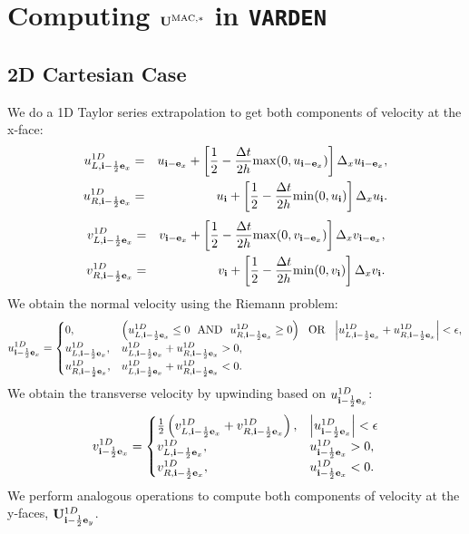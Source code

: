 \newpage

\section{Computing ${\bf U}^{\rm MAC,*}$ in {\tt VARDEN}}

\subsection{2D Cartesian Case}
We do a 1D Taylor series extrapolation to get both components of velocity at the x-face:
\begin{eqnarray}
u_{L,{\bf i}-\frac{1}{2}{\bf e}_x}^{1D} &=& u_{{\bf i}-{\bf e}_x} + \left[\frac{1}{2} - \frac{\Delta t}{2h}{\rm max}(0,u_{{\bf i}-{\bf e}_x})\right]\Delta_xu_{{\bf i}-{\bf e}_x}, \label{varden U_L^1D} \\
u_{R,{\bf i}-\frac{1}{2}{\bf e}_x}^{1D} &=& u_{{\bf i}} + \left[\frac{1}{2} - \frac{\Delta t}{2h}{\rm min}(0,u_{{\bf i}})\right]\Delta_xu_{{\bf i}}.
\end{eqnarray}
\begin{eqnarray}
v_{L,{\bf i}-\frac{1}{2}{\bf e}_x}^{1D} &=& v_{{\bf i}-{\bf e}_x} + \left[\frac{1}{2} - \frac{\Delta t}{2h}{\rm max}(0,v_{{\bf i}-{\bf e}_x})\right]\Delta_xv_{{\bf i}-{\bf e}_x}, \label{varden U_L^1D} \\
v_{R,{\bf i}-\frac{1}{2}{\bf e}_x}^{1D} &=& v_{{\bf i}} + \left[\frac{1}{2} - \frac{\Delta t}{2h}{\rm min}(0,v_{{\bf i}})\right]\Delta_xv_{{\bf i}}.
\end{eqnarray}
We obtain the normal velocity using the Riemann problem:
\begin{equation}
u_{{\bf i}-\frac{1}{2}{\bf e}_x}^{1D} =
\begin{cases}
0, & \left(u_{L,{\bf i}-\frac{1}{2}{\bf e}_x}^{1D} \le 0 ~~ {\rm AND} ~~ u_{R,{\bf i}-\frac{1}{2}{\bf e}_x}^{1D} \ge 0\right) ~~ {\rm OR} ~~ \left|u_{L,{\bf i}-\frac{1}{2}{\bf e}_x}^{1D} + u_{R,{\bf i}-\frac{1}{2}{\bf e}_x}^{1D}\right| < \epsilon, \\
u_{L,{\bf i}-\frac{1}{2}{\bf e}_x}^{1D}, & u_{L,{\bf i}-\frac{1}{2}{\bf e}_x}^{1D} + u_{R,{\bf i}-\frac{1}{2}{\bf e}_x}^{1D} > 0, \\
u_{R,{\bf i}-\frac{1}{2}{\bf e}_x}^{1D}, & u_{L,{\bf i}-\frac{1}{2}{\bf e}_x}^{1D} + u_{R,{\bf i}-\frac{1}{2}{\bf e}_x}^{1D} < 0.
\end{cases}
\end{equation}
We obtain the transverse velocity by upwinding based on
$u_{{\bf i}-\frac{1}{2}{\bf e}_x}^{1D}$:
\begin{equation}
v_{{\bf i}-\frac{1}{2}{\bf e}_x}^{1D} =
\begin{cases}
\frac{1}{2}\left(v_{L,{\bf i}-\frac{1}{2}{\bf e}_x}^{1D} + v_{R,{\bf i}-\frac{1}{2}{\bf e}_x}^{1D}\right), & \left|u_{{\bf i}-\frac{1}{2}{\bf e}_x}^{1D}\right| < \epsilon \\
v_{L,{\bf i}-\frac{1}{2}{\bf e}_x}^{1D}, & u_{{\bf i}-\frac{1}{2}{\bf e}_x}^{1D} > 0, \\
v_{R,{\bf i}-\frac{1}{2}{\bf e}_x}^{1D}, & u_{{\bf i}-\frac{1}{2}{\bf e}_x}^{1D} < 0.
\end{cases}\label{Transverse Velocity Riemann Problem}
\end{equation}
We perform analogous operations to compute both components of velocity
at the y-faces, ${\bf U}_{{\bf i}-\frac{1}{2}{\bf e}_y}^{1D}$. \\

